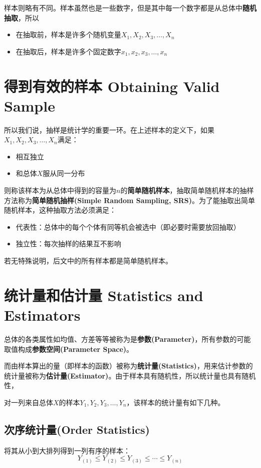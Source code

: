 \documentclass[UTF8]{ctexbook}
\begin{document}
样本则略有不同。样本虽然也是一些数字，但是其中每一个数字都是从总体中\textbf{随机抽取}，所以
\begin{itemize}
	\item 在抽取前，样本是许多个随机变量$X_1, X_2, X_3,\dots, X_n$
	\item 在抽取后，样本是许多个固定数字$x_1, x_2, x_3,\dots, x_n$
\end{itemize}

\section{得到有效的样本 Obtaining Valid Sample}
所以我们说，抽样是统计学的重要一环。在上述样本的定义下，如果$X_1, X_2, X_3,\dots, X_n$满足：
\begin{itemize}
	\item 相互独立
	\item 和总体$X$服从同一分布
\end{itemize}

则称该样本为从总体中得到的容量为$n$的\textbf{简单随机样本}，抽取简单随机样本的抽样方法称为\textbf{简单随机抽样(Simple Random Sampling, SRS)}。为了能抽取出简单随机样本，这种抽取方法必须满足：
\begin{itemize}
	\item 代表性：总体中的每个个体有同等机会被选中（即必要时需要放回抽取）
	\item 独立性：每次抽样的结果互不影响
\end{itemize}

若无特殊说明，后文中的所有样本都是简单随机样本。
\section{统计量和估计量 Statistics and Estimators}
总体的各类属性如均值、方差等等被称为是\textbf{参数(Parameter)}，所有参数的可能取值构成\textbf{参数空间(Parameter Space)}。

而由样本算出的量（即样本的函数）被称为\textbf{统计量(Statistics)}，用来估计参数的统计量被称为\textbf{估计量(Estimator)}。由于样本具有随机性，所以统计量也具有随机性，

对一列来自总体$X$的样本$Y_1,Y_2,Y_3,\dots,Y_n$，该样本的统计量有如下几种。
\subsection{次序统计量(Order Statistics)}
将其从小到大排列得到一列有序的样本：
\[
	Y_{(1)}\leq Y_{(2)}\leq Y_{(3)}\leq\cdots\leq Y_{(n)}
\]
\end{document}
